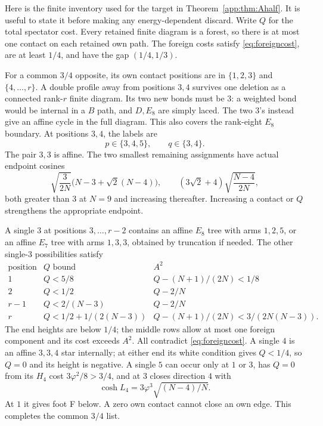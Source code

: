 \documentclass[11pt]{article}
\theoremstyle{definition}
\theoremstyle{remark}
\newcommand{\ph}{\varphi}
\begin{document}
Here is the finite inventory used for the target in
Theorem~\ref{app:thm:Ahalf}. It is useful to state it before making any
energy-dependent discard. Write \(Q\) for the total spectator cost.
Every retained finite diagram is a forest, so there is at most one
contact on each retained own path. The foreign costs satisfy
\eqref{eq:foreigncost}, are at least \(1/4\), and have the gap
\((1/4,1/3)\).

For a common \(3/4\) opposite, its own contact positions are in
\(\{1,2,3\}\) and \(\{4,\ldots,r\}\). A double profile away from
positions \(3,4\) survives one deletion as a connected rank-\(r\)
finite diagram. Its two new bonds must be \(3\): a weighted bond
would be internal in a \(B\) path, and \(D,E_8\) are simply laced.
The two \(3\)'s instead give an affine cycle in the full diagram.
This also covers the rank-eight \(E_8\) boundary.
At positions \(3,4\), the labels are
\[
 p\in\{3,4,5\},\qquad q\in\{3,4\}.
\]
The pair \(3,3\) is affine. The two smallest remaining assignments
have actual endpoint cosines
\begin{equation}\label{app:eq:Acentral}
 \sqrt{\frac3{2N}}\bigl(N-3+\sqrt2(N-4)\bigr),\qquad
 (3\sqrt2+4)\sqrt{\frac{N-4}{2N}},
\end{equation}
both greater than \(3\) at \(N=9\) and increasing thereafter.
Increasing a contact or \(Q\) strengthens the appropriate endpoint.

A single \(3\) at positions \(3,\ldots,r-2\) contains an affine
\(E_8\) tree with arms \(1,2,5\), or an affine \(E_7\) tree with
arms \(1,3,3\), obtained by truncation if needed. The other
single-\(3\) possibilities satisfy
\[
\begin{array}{c|c|c}
 \text{position}&Q\text{ bound}&A^2\\ \hline
 1&Q<5/8&Q-(N+1)/(2N)<1/8\\
 2&Q<1/2&Q-2/N\\
 r-1&Q<2/(N-3)&Q-2/N\\
 r&Q<1/2+1/(2(N-3))&
          Q-(N+1)/(2N)<3/(2N(N-3)).
\end{array}
\]
The end heights are below \(1/4\); the middle rows allow at most
one foreign component and its cost exceeds \(A^2\). All contradict
\eqref{eq:foreigncost}. A single \(4\) is an affine \(3,3,4\) star
internally; at either end its white condition gives \(Q<1/4\),
so \(Q=0\) and its height is negative. A single \(5\) can occur
only at \(1\) or \(3\), has \(Q=0\) from its \(H_4\) cost
\(3\ph^2/8>3/4\), and at \(3\) closes direction \(4\) with
\begin{equation}\label{app:eq:Aiso5central}
 \cosh L_4=3\ph^3\sqrt{(N-4)/N}.
\end{equation}
At \(1\) it gives foot F below. A zero own contact cannot close
an own edge. This completes the common \(3/4\) list.
\end{document}
